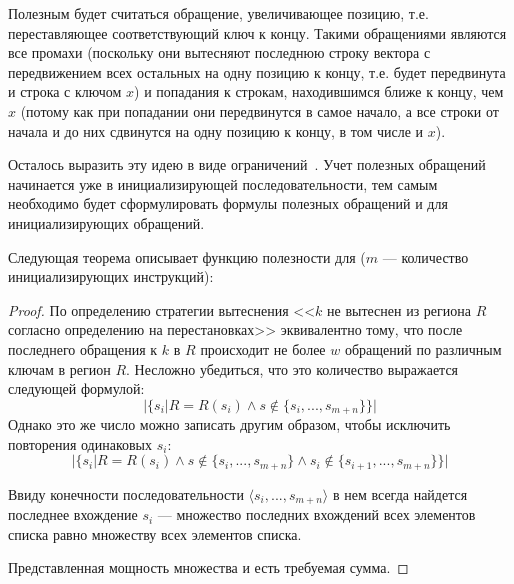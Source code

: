 Полезным будет считаться обращение, увеличивающее позицию, т.е.
переставляющее соответствующий ключ к концу. Такими обращениями являются все
промахи (поскольку они вытесняют последнюю строку вектора с передвижением всех остальных на одну позицию к концу, т.е. будет передвинута и строка с ключом $x$) и
попадания к строкам, находившимся ближе к концу, чем $x$ (потому как при попадании они передвинутся в самое начало, а все строки от начала и до них сдвинутся на одну
позицию к концу, в том числе и $x$).

Осталось выразить эту идею в виде ограничений~\cite{my_ewdts_2009}.
Учет полезных обращений начинается уже в инициализирующей последовательности,
тем самым необходимо будет сформулировать формулы полезных обращений и для
инициализирующих обращений.

Следующая теорема описывает функцию полезности для \LRU ($m$ --- количество
инициализирующих инструкций):

\begin{theorem}\label{correct_mirror_LRU} \LRUusefuls
\end{theorem}

\begin{proof}
По определению стратегии вытеснения \LRU <<$k$ не вытеснен из региона $R$ согласно определению на перестановках>> эквивалентно тому, что после последнего обращения к $k$ в $R$ происходит не более $w$ обращений по различным ключам в регион $R$. Несложно убедиться, что это количество выражается следующей формулой: $$|\{s_i| R = R(s_i) \wedge s \notin \{s_i, ..., s_{m+n}\}\}|$$
Однако это же число можно записать другим образом, чтобы исключить повторения одинаковых $s_i$:
$$|\{s_i| R = R(s_i) \wedge s \notin \{s_i, ..., s_{m+n}\} \wedge s_i \notin \{s_{i+1}, ..., s_{m+n}\}\}|$$

Ввиду конечности последовательности $\langle s_i, ..., s_{m+n}\rangle$ в нем всегда найдется последнее вхождение $s_i$ --- множество последних вхождений всех элементов списка равно множеству всех элементов списка.

Представленная мощность множества и есть требуемая сумма.
\end{proof}

